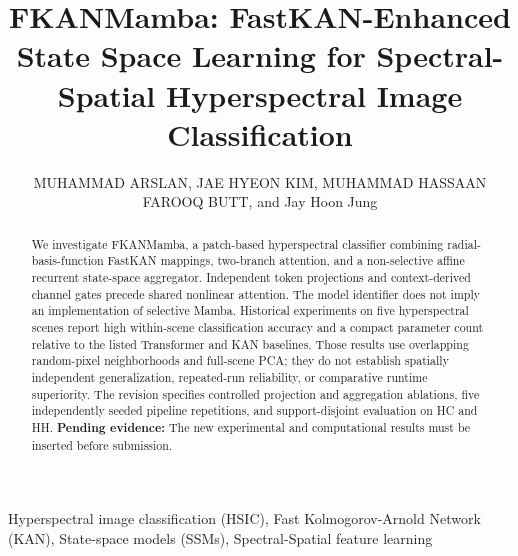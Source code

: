 \documentclass{revision_assets/ieeeaccess_revision}
\newif\ifrevisionhighlights
\newenvironment{revision}{\ifrevisionhighlights\begin{shaded*}\fi}{\ifrevisionhighlights\end{shaded*}\fi}
\newcommand{\pending}[1]{\textcolor{red!70!black}{\textbf{Pending evidence:} #1}}
\begin{document}
\doi{}
\title{FKANMamba: FastKAN-Enhanced State Space Learning for Spectral-Spatial Hyperspectral Image Classification}
\author{\uppercase{Muhammad Arslan},
\uppercase{Jae Hyeon Kim, Muhammad Hassaan Farooq Butt}, and Jay Hoon Jung}
\address[1]{Department of Computer Engineering, Korea Aerospace University, Gyeonggi-do 10540,  Republic of Korea (e-mail: arslan@kau.ac.kr)}
\address[2]{Faculty of Environmental Sciences and Natural Resource Management (MINA), Norwegian University of Life Sciences (NMBU), 1432 Ås, Norway (e-mail: mubut0522@nmbu.no)}


\begin{abstract}
\begin{revision}
We investigate FKANMamba, a patch-based hyperspectral classifier combining radial-basis-function FastKAN mappings, two-branch attention, and a non-selective affine recurrent state-space aggregator. Independent token projections and context-derived channel gates precede shared nonlinear attention. The model identifier does not imply an implementation of selective Mamba. Historical experiments on five hyperspectral scenes report high within-scene classification accuracy and a compact parameter count relative to the listed Transformer and KAN baselines. Those results use overlapping random-pixel neighborhoods and full-scene PCA; they do not establish spatially independent generalization, repeated-run reliability, or comparative runtime superiority. The revision specifies controlled projection and aggregation ablations, five independently seeded pipeline repetitions, and support-disjoint evaluation on HC and HH. \pending{The new experimental and computational results must be inserted before submission.}
\end{revision}
\end{abstract}
\begin{keywords}
Hyperspectral image classification (HSIC), Fast Kolmogorov-Arnold Network (KAN), State-space models (SSMs), Spectral-Spatial feature learning
\end{keywords}

\titlepgskip=-15pt
\maketitle
\end{document}
